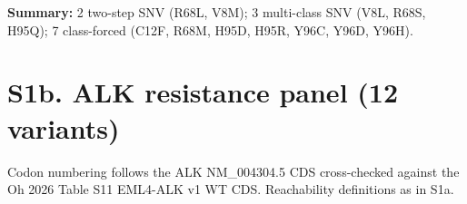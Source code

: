 \documentclass[10pt,a4paper,landscape]{article}
\begin{document}
\vspace{4pt}
\noindent\footnotesize
\textbf{Summary:} 2 two-step SNV (R68L, V8M); 3 multi-class SNV (V8L, R68S, H95Q); 7 class-forced (C12F, R68M, H95D, H95R, Y96C, Y96D, Y96H).

\vspace{18pt}
\normalsize

\section*{S1b. ALK resistance panel (12 variants)}

\noindent Codon numbering follows the ALK NM\_004304.5 CDS cross-checked against the Oh 2026 Table S11 EML4-ALK v1 WT CDS. Reachability definitions as in S1a.

\vspace{6pt}
\end{document}
